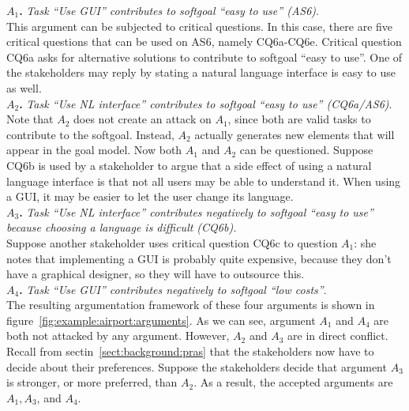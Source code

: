 \documentclass[11.5pt,two column]{llncs}
\begin{document}
\noindent
\textbf{$A_1$.} \emph{Task ``Use GUI'' contributes to softgoal ``easy to use'' (AS6)}.\\

\noindent
This argument can be subjected to critical questions. In this case, there are five critical questions that can be used on AS6, namely CQ6a-CQ6e. Critical question CQ6a asks for alternative solutions to contribute to softgoal ``easy to use''. One of the stakeholders may reply by stating a natural language interface is easy to use as well.\\

\noindent
\textbf{$A_2$.} \emph{Task ``Use NL interface'' contributes to softgoal ``easy to use'' (CQ6a/AS6)}.\\

\noindent
Note that $A_2$ does not create an attack on $A_1$, since both are valid tasks to contribute to the softgoal. Instead, $A_2$ actually generates new elements that will appear in the goal model.  Now both $A_1$ and $A_2$ can be questioned. Suppose CQ6b is used by a stakeholder to argue that a side effect of using a natural language interface is that not all users may be able to understand it. When using a GUI, it may be easier to let the user change its language.\\

\noindent
\textbf{$A_3$.} \emph{Task ``Use NL interface'' contributes negatively to softgoal ``easy to use'' because choosing a language is difficult (CQ6b).}\\

Suppose another stakeholder uses critical question CQ6c to question $A_1$: she notes that implementing a GUI is probably quite expensive, because they don't have a graphical designer, so they will have to outsource this.\\

\noindent
\textbf{$A_4$.} \emph{Task ``Use GUI'' contributes negatively to softgoal ``low costs''}.\\

\noindent
The resulting argumentation framework of these four arguments is shown in figure~\ref{fig:example:airport:arguments}. As we can see, argument $A_1$ and $A_4$ are both not attacked by any argument. However, $A_2$ and $A_3$ are in direct conflict. Recall from sectin~\ref{sect:background:pras} that the stakeholders now have to decide about their preferences. Suppose the stakeholders decide that argument $A_3$ is stronger, or more preferred, than $A_2$. As a result, the accepted arguments are $A_1, A_3$, and $A_4$. 
\end{document}
